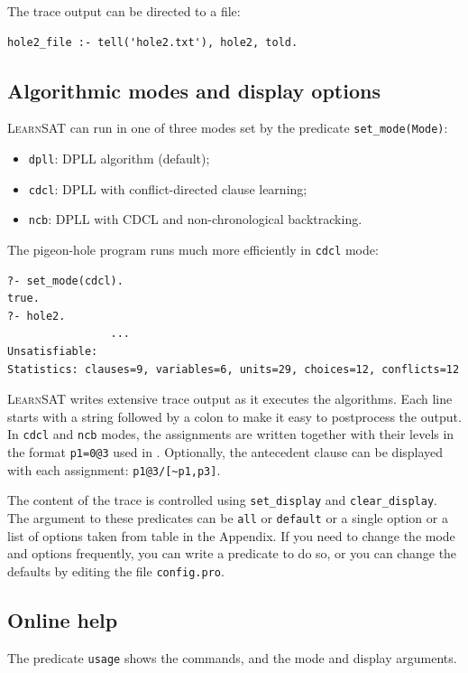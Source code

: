 \documentclass[11pt]{article}
\newcommand*{\p}[1]{\textup{\texttt{#1}}}
\newcommand*{\ls}{\textsc{LearnSAT}}
\begin{document}
The trace output can be directed to a file:

\begin{verbatim}
hole2_file :- tell('hole2.txt'), hole2, told.
\end{verbatim}

\subsection{Algorithmic modes and display options}

\ls{} can run in one of three modes set by the predicate \p{set\_mode(Mode)}:
\begin{itemize}
\item \p{dpll}: DPLL algorithm (default);
\item \p{cdcl}: DPLL with conflict-directed clause learning;
\item \p{ncb}:  DPLL with CDCL and non-chronological backtracking.
\end{itemize}

The pigeon-hole program runs much more efficiently in \p{cdcl} mode:
\begin{verbatim}
?- set_mode(cdcl).
true.
?- hole2.
                ...
Unsatisfiable:
Statistics: clauses=9, variables=6, units=29, choices=12, conflicts=12
\end{verbatim}

\ls{} writes extensive trace output as it executes the algorithms. Each
line starts with a string followed by a colon to make it easy to
postprocess the output. In \p{cdcl} and \p{ncb} modes, the assignments
are written together with their levels in the format \p{p1=0@3} used in
\cite{mlm}. Optionally, the antecedent clause can be displayed with each
assignment: \verb+p1@3/[~p1,p3]+.

The content of the trace is controlled using \p{set\_display} and
\p{clear\_display}. The argument to these predicates can be \p{all} or
\p{default} or a single option or a list of options taken from table in
the Appendix. If you need to change the mode and options frequently, you
can write a predicate to do so, or you can change the defaults by
editing the file \p{config.pro}.

\subsection{Online help}

The predicate \p{usage} shows the commands, and the mode and display
arguments.
\end{document}
